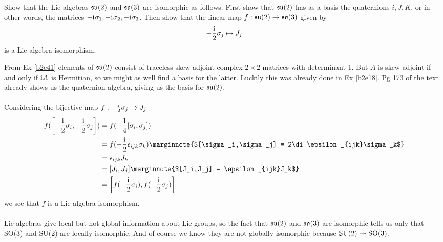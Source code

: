 \documentclass[10pt]{article}
\begin{document}
\begin{example}\label{b2e45}
	Show that the Lie algebras $\mathfrak{su}(2)$ and $\mathfrak{so}(3)$ are isomorphic as follows. First show that $\mathfrak{su}(2)$ has as a basis the quaternions $i,J,K$, or in other words, the matrices $-\mathrm{i}\mkern1mu\sigma_1, -\mathrm{i}\mkern1mu\sigma_2, -\mathrm{i}\mkern1mu\sigma_3$. Then show that the linear map $f:\mathfrak{su}(2)\to \mathfrak{so}(3)$ given by
	$$
	-\frac{\mathrm{i}\mkern1mu}{2}\sigma_j\mapsto J_j
	$$
	is a Lie algebra isomorphism.
\end{example}
\sol From Ex \ref{b2e41} elements of $\mathfrak{su}(2)$ consist of traceless skew-adjoint complex $2 \times 2$ matrices with determinant 1. But $A$ is skew-adjoint if and only if $\mathrm{i}\mkern1mu A$ is Hermitian, so we might as well find a basis for the latter. Luckily this was already done in Ex \ref{b2e18}. Pg 173 of the text already shows us the quaternion algebra, giving us the basis for $\mathfrak{su}(2)$.\\\\
Considering the bijective map $f:-\frac{\mathrm{i}\mkern1mu}{2}\sigma_j\to J_j$
$$
\begin{aligned}
	f(\sparen*{-\frac{\di}{2}\sigma_i,-\frac{\di}{2}\sigma_j}) &= f(-\frac14[\sigma_i,\sigma_j])\\
	&= f(-\frac{\di}{2}\epsilon_{ijk}\sigma_k)\marginnote{$[\sigma_i,\sigma_j] = 2\di\epsilon_{ijk}\sigma_k$}\\
	&= \epsilon_{ijk}J_k\\
	&= [J_i,J_j]\marginnote{$[J_i,J_j] = \epsilon_{ijk}J_k$}\\
	&= \sparen*{f(-\frac{\di}{2}\sigma_i),f(-\frac{\di}{2}\sigma_j)}
\end{aligned}
$$
we see that $f$ is a Lie algebra isomorphism.\\\\
Lie algebras give local but not global information about Lie groups, so the fact that $\mathfrak{su}(2)$ and $\mathfrak{so}(3)$ are isomorphic tells us only that SO(3) and SU(2) are locally isomorphic. And of course we know they are not globally isomorphic because ${\rm SU}(2) \twoheadrightarrow {\rm SO}(3)$.
\end{document}
